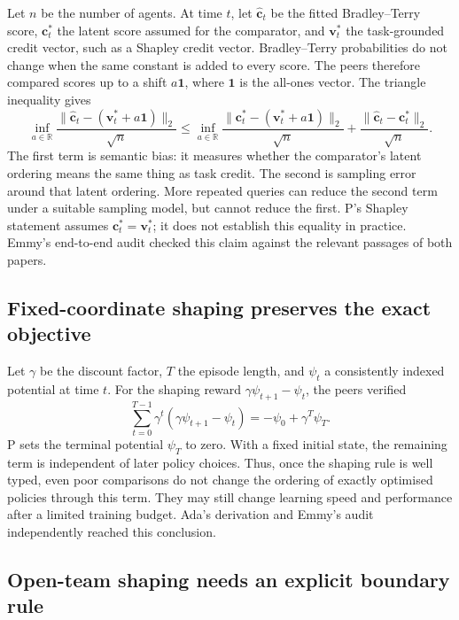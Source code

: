 \documentclass{article}
\begin{document}
Let \(n\) be the number of agents.  At time \(t\), let \(\widehat{\mathbf c}_t\) be the fitted Bradley--Terry score, \(\mathbf c_t^*\) the latent score assumed for the comparator, and \(\mathbf v_t^*\) the task-grounded credit vector, such as a Shapley credit vector.  Bradley--Terry probabilities do not change when the same constant is added to every score.  The peers therefore compared scores up to a shift \(a\mathbf 1\), where \(\mathbf 1\) is the all-ones vector.  The triangle inequality gives
\[
 \inf_{a\in\mathbb R}
 \frac{\lVert\widehat{\mathbf c}_t-(\mathbf v_t^*+a\mathbf 1)\rVert_2}{\sqrt n}
 \leq
 \inf_{a\in\mathbb R}
 \frac{\lVert\mathbf c_t^*-(\mathbf v_t^*+a\mathbf 1)\rVert_2}{\sqrt n}
 +\frac{\lVert\widehat{\mathbf c}_t-\mathbf c_t^*\rVert_2}{\sqrt n}.
\]
The first term is semantic bias: it measures whether the comparator's latent ordering means the same thing as task credit.  The second is sampling error around that latent ordering.  More repeated queries can reduce the second term under a suitable sampling model, but cannot reduce the first.  P's Shapley statement assumes \(\mathbf c_t^*=\mathbf v_t^*\); it does not establish this equality in practice.  Emmy's end-to-end audit checked this claim against the relevant passages of both papers.

\subsection{Fixed-coordinate shaping preserves the exact objective}

Let \(\gamma\) be the discount factor, \(T\) the episode length, and \(\psi_t\) a consistently indexed potential at time \(t\).  For the shaping reward \(\gamma\psi_{t+1}-\psi_t\), the peers verified
\[
 \sum_{t=0}^{T-1}\gamma^t(\gamma\psi_{t+1}-\psi_t)
 =-\psi_0+\gamma^T\psi_T.
\]
P sets the terminal potential \(\psi_T\) to zero.  With a fixed initial state, the remaining term is independent of later policy choices.  Thus, once the shaping rule is well typed, even poor comparisons do not change the ordering of exactly optimised policies through this term.  They may still change learning speed and performance after a limited training budget.  Ada's derivation and Emmy's audit independently reached this conclusion.

\subsection{Open-team shaping needs an explicit boundary rule}
\end{document}
